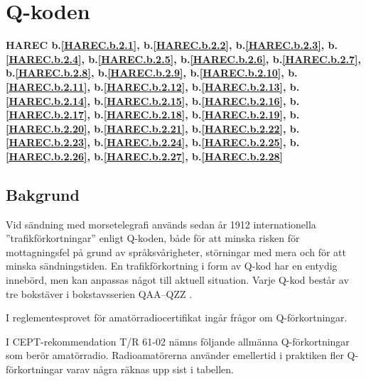\section{Q-koden}
\label{q-koden}
\textbf{
HAREC b.\ref{HAREC.b.2.1}\label{myHAREC.b.2.1},
 b.\ref{HAREC.b.2.2}\label{myHAREC.b.2.2},
 b.\ref{HAREC.b.2.3}\label{myHAREC.b.2.3},
 b.\ref{HAREC.b.2.4}\label{myHAREC.b.2.4},
 b.\ref{HAREC.b.2.5}\label{myHAREC.b.2.5},
 b.\ref{HAREC.b.2.6}\label{myHAREC.b.2.6},
 b.\ref{HAREC.b.2.7}\label{myHAREC.b.2.7},
 b.\ref{HAREC.b.2.8}\label{myHAREC.b.2.8},
 b.\ref{HAREC.b.2.9}\label{myHAREC.b.2.9},
 b.\ref{HAREC.b.2.10}\label{myHAREC.b.2.10},
 b.\ref{HAREC.b.2.11}\label{myHAREC.b.2.11},
 b.\ref{HAREC.b.2.12}\label{myHAREC.b.2.12},
 b.\ref{HAREC.b.2.13}\label{myHAREC.b.2.13},
 b.\ref{HAREC.b.2.14}\label{myHAREC.b.2.14},
 b.\ref{HAREC.b.2.15}\label{myHAREC.b.2.15},
 b.\ref{HAREC.b.2.16}\label{myHAREC.b.2.16},
 b.\ref{HAREC.b.2.17}\label{myHAREC.b.2.17},
 b.\ref{HAREC.b.2.18}\label{myHAREC.b.2.18},
 b.\ref{HAREC.b.2.19}\label{myHAREC.b.2.19},
 b.\ref{HAREC.b.2.20}\label{myHAREC.b.2.20},
 b.\ref{HAREC.b.2.21}\label{myHAREC.b.2.21},
 b.\ref{HAREC.b.2.22}\label{myHAREC.b.2.22},
 b.\ref{HAREC.b.2.23}\label{myHAREC.b.2.23},
 b.\ref{HAREC.b.2.24}\label{myHAREC.b.2.24},
 b.\ref{HAREC.b.2.25}\label{myHAREC.b.2.25},
 b.\ref{HAREC.b.2.26}\label{myHAREC.b.2.26},
 b.\ref{HAREC.b.2.27}\label{myHAREC.b.2.27},
 b.\ref{HAREC.b.2.28}\label{myHAREC.b.2.28}
}

\subsection{Bakgrund}

Vid sändning med morsetelegrafi används sedan år 1912 internationella
''trafikförkortningar'' enligt Q-koden, både för att minska risken för
mottagningsfel på grund av språksvårigheter, störningar med mera och för
att minska sändningstiden.
En trafikförkortning i form av Q-kod har en entydig innebörd, men kan anpassas
något till aktuell situation.
Varje Q-kod består av tre bokstäver i bokstavsserien QAA--QZZ
\cite[M.1172]{ITU-RR}.

I reglementesprovet för amatörradiocertifikat ingår frågor om Q-förkortningar.

I CEPT-rekommendation T/R 61-02 \cite[Annex 6]{TR6102} nämns följande allmänna
Q-förkortningar som berör amatörradio.
Radioamatörerna använder emellertid i praktiken fler Q-förkortningar varav
några räknas upp sist i tabellen.


